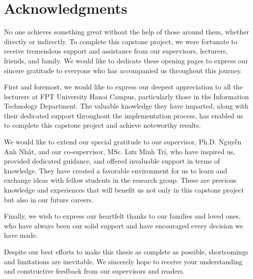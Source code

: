 \chapter*{\centering\Large{Acknowledgments}}

No one achieves something great without the help of those around them, whether directly or indirectly. To complete this capstone project, we were fortunate to receive tremendous support and assistance from our supervisors, lecturers, friends, and family. We would like to dedicate these opening pages to express our sincere gratitude to everyone who has accompanied us throughout this journey.

First and foremost, we would like to express our deepest appreciation to all the lecturers at FPT University Hanoi Campus, particularly those in the Information Technology Department. The valuable knowledge they have imparted, along with their dedicated support throughout the implementation process, has enabled us to complete this capstone project and achieve noteworthy results.

We would like to extend our special gratitude to our supervisor, Ph.D. Nguyễn Anh Nhật, and our co-supervisor, MSc. Lưu Minh Trí, who have inspired us, provided dedicated guidance, and offered invaluable support in terms of knowledge. They have created a favorable environment for us to learn and exchange ideas with fellow students in the research group. These are precious knowledge and experiences that will benefit us not only in this capstone project but also in our future careers.

Finally, we wish to express our heartfelt thanks to our families and loved ones, who have always been our solid support and have encouraged every decision we have made.

Despite our best efforts to make this thesis as complete as possible, shortcomings and limitations are inevitable. We sincerely hope to receive your understanding and constructive feedback from our supervisors and readers.
